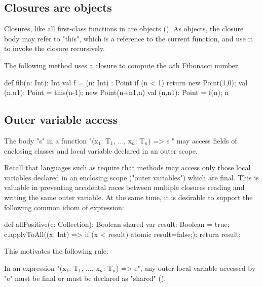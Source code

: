 \subsection{Closures are objects}

Closures, like all first-class functions in \Xten{} are
objects
().
As objects, the closure body may refer to
\xcd"this", which is a reference to the current function,
and use it to invoke the closure recursively.

\begin{example}
The following method uses a closure to compute the $n$th
Fibonacci number.
\begin{xten}
def fib(n: Int): Int {
    val f = (n: Int) : Point {
        if (n < 1) return new Point(1,0);
        val (n,n1): Point = this(n-1);
        new Point(n+n1,n)
    }
    val (n,n1): Point = f(n);
    n
}
\end{xten}
\end{example}

\subsection{Outer variable access}

The body \xcd"s" in a function
\xcdmath"(x$_1$: T$_1$, $\dots$, x$_n$: T$_n$) => { s }"
may access fields
of enclosing classes and local variable declared in an outer scope.

Recall that languages such as \java{} require that methods may
access only those local variables declared in an enclosing scope
("outer variables") which are final. This is valuable in
preventing accidental races between multiple closures reading
and writing the same outer variable. At the same time, it is
desirable to support the following common idiom of expression:

\begin{xten}
def allPositive(c: Collection): Boolean {
  shared var result: Boolean = true;
  c.applyToAll((x: Int) => { if (x < result) atomic {result=false;}});
  return result;
}
\end{xten}

This motivates the following rule:

\begin{staticrule*}
In an expression
\xcdmath"(x$_1$: T$_1$, $\dots$, x$_n$: T$_n$) => e",
any outer local variable accessed by \xcd"e" must be final or
must be declared
as \xcd"shared" ().
\end{staticrule*}

